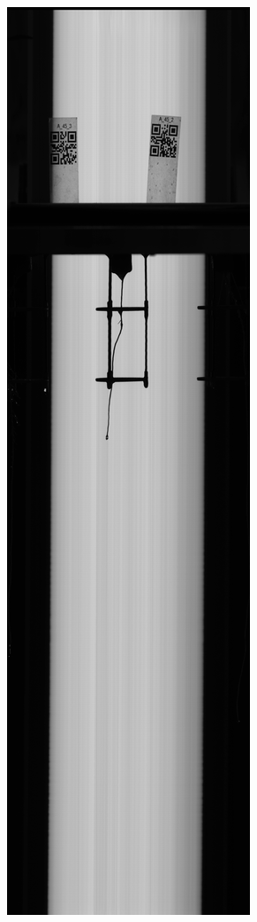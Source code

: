 \begin{figure}
\centering
\begin{subfigure}[b]{.13\textwidth}
  \centering
  \includegraphics[width=\linewidth]{figures/NO_RS.jpg}

\end{subfigure}
\end{figure}
